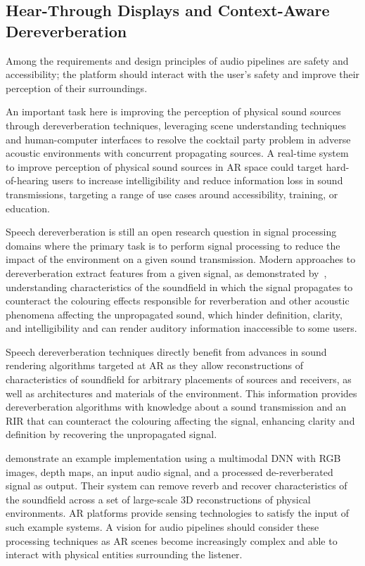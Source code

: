 \subsection{Hear-Through Displays and Context-Aware Dereverberation}
Among the requirements and design principles of audio pipelines are safety and accessibility; the platform should interact with the user's safety and improve their perception of their surroundings. \par
An important task here is improving the perception of physical sound sources through dereverberation techniques, leveraging scene understanding techniques and human-computer interfaces to resolve the cocktail party problem in adverse acoustic environments with concurrent propagating sources. A real-time system to improve perception of physical sound sources in AR space could target hard-of-hearing users to increase intelligibility and reduce information loss in sound transmissions, targeting a range of use cases around accessibility, training, or education. \par
Speech dereverberation is still an open research question in signal processing domains where the primary task is to perform signal processing to reduce the impact of the environment on a given sound transmission. Modern approaches to dereverberation extract features from a given signal, as demonstrated by~\cite{santos2018speech}, understanding characteristics of the soundfield in which the signal propagates to counteract the colouring effects responsible for reverberation and other acoustic phenomena affecting the unpropagated sound, which hinder definition, clarity, and intelligibility and can render auditory information inaccessible to some users.\par
Speech dereverberation techniques directly benefit from advances in sound rendering algorithms targeted at AR as they allow reconstructions of characteristics of soundfield for arbitrary placements of sources and receivers, as well as architectures and materials of the environment. This information provides dereverberation algorithms with knowledge about a sound transmission and an RIR that can counteract the colouring affecting the signal, enhancing clarity and definition by recovering the unpropagated signal.\par
\cite{chen2023learning} demonstrate an example implementation using a multimodal DNN with RGB images, depth maps, an input audio signal, and a processed de-reverberated signal as output. Their system can remove reverb and recover characteristics of the soundfield across a set of large-scale 3D reconstructions of physical environments. AR platforms provide sensing technologies to satisfy the input of such example systems. A vision for audio pipelines should consider these processing techniques as AR scenes become increasingly complex and able to interact with physical entities surrounding the listener.\par
